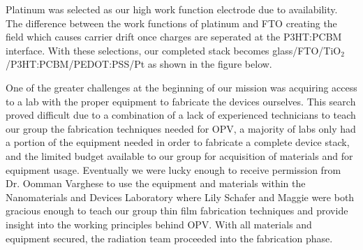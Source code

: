 	
	Platinum was selected as our high work function electrode due to availability. The difference between the work functions of platinum and FTO creating the field which causes carrier drift once charges are seperated at the P3HT:PCBM interface. With these selections, our completed stack becomes glass/FTO/TiO$_2$/P3HT:PCBM/PEDOT:PSS/Pt as shown in the figure below. \\
	
	
	One of the greater challenges at the beginning of our mission was acquiring access to a lab with the proper equipment to fabricate the devices ourselves. This search proved difficult due to a combination of a lack of experienced technicians to teach our group the fabrication techniques needed for OPV, a majority of labs only had a portion of the equipment needed in order to fabricate a complete device stack, and the limited budget available to our group for acquisition of materials and for equipment usage. Eventually we were lucky enough to receive permission from Dr. Oomman Varghese to use the equipment and materials within the Nanomaterials and Devices Laboratory where Lily Schafer and Maggie were both gracious enough to teach our group thin film fabrication techniques  and provide insight into the working principles behind OPV. With all materials and equipment secured, the radiation team proceeded into the fabrication phase. \\
